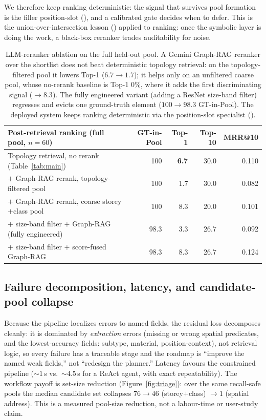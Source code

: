 We therefore keep ranking deterministic: the signal that survives pool formation is the filler
position-slot (), and a calibrated gate decides when to defer. This is the
union-over-intersection lesson () applied to ranking: once the symbolic layer is
doing the work, a black-box reranker trades auditability for noise.

\begin{table}[ht]
  \centering
  \small
  \begin{tabular}{lrrrr}
    \toprule
    Post-retrieval ranking (full pool, $n=60$) & GT-in-Pool & Top-1 & Top-10 & MRR@10 \\
    \midrule
    Topology retrieval, no rerank (Table~\ref{tab:main}) & 100 & \textbf{6.7} & 30.0 & 0.110 \\
    \quad $+$ Graph-RAG rerank, topology-filtered pool & 100 & 1.7 & 30.0 & 0.082 \\
    \quad $+$ Graph-RAG rerank, coarse storey$+$class pool & 100 & 8.3 & 20.0 & 0.101 \\
    \quad $+$ size-band filter $+$ Graph-RAG (fully engineered) & 98.3 & 3.3 & 26.7 & 0.092 \\
    \quad $+$ size-band filter $+$ score-fused Graph-RAG & 98.3 & 8.3 & 26.7 & 0.124 \\
    \bottomrule
  \end{tabular}
  \caption{LLM-reranker ablation on the full held-out pool. A Gemini Graph-RAG reranker over the
  shortlist does not beat deterministic topology retrieval: on the topology-filtered pool it lowers
  Top-1 ($6.7 \to 1.7$); it helps only on an unfiltered coarse pool, whose no-rerank baseline is
  Top-1 $0\%$, where it adds the first discriminating signal ($\to 8.3$). The fully engineered variant
  (adding a ResNet size-band filter) regresses and evicts one ground-truth element ($100 \to 98.3$
  GT-in-Pool). The deployed system keeps ranking deterministic via the position-slot specialist
  ().}
  \label{tab:rerank-ablation}
\end{table}

\subsection{Failure decomposition, latency, and candidate-pool collapse}
\label{sec:eval-failure}

Because the pipeline localizes errors to named fields, the residual loss decomposes cleanly: it is
dominated by \emph{extraction} errors (missing or wrong spatial predicates, and the lowest-accuracy
fields: subtype, material, position-context), not retrieval logic, so every failure has a traceable
stage and the roadmap is ``improve the named weak fields,'' not ``redesign the planner.'' Latency
favours the constrained pipeline (${\sim}1$\,s vs.\ ${\sim}4.5$\,s for a ReAct agent, with exact
repeatability). The workflow payoff is set-size reduction (Figure~\ref{fig:triage}): over the same
recall-safe pools the median candidate set collapses $76 \to 46$ (storey$+$class) $\to 1$ (spatial
address). This is a measured pool-size reduction, not a labour-time or user-study claim.

